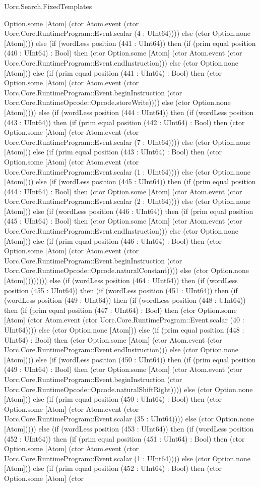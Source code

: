 \begin{lexlean}{Uorc.Search.FixedTemplates}
\begin{semanticmodule}
{Option.some [Atom] (ctor Atom.event (ctor Uorc.Core.RuntimeProgram::Event.scalar (4 : UInt64)))) else (ctor Option.none [Atom]))) else (if (wordLess position (441 : UInt64)) then (if (prim equal position (440 : UInt64) : Bool) then (ctor Option.some [Atom] (ctor Atom.event (ctor Uorc.Core.RuntimeProgram::Event.endInstruction))) else (ctor Option.none [Atom])) else (if (prim equal position (441 : UInt64) : Bool) then (ctor Option.some [Atom] (ctor Atom.event (ctor Uorc.Core.RuntimeProgram::Event.beginInstruction (ctor Uorc.Core.RuntimeOpcode::Opcode.storeWrite)))) else (ctor Option.none [Atom])))) else (if (wordLess position (444 : UInt64)) then (if (wordLess position (443 : UInt64)) then (if (prim equal position (442 : UInt64) : Bool) then (ctor Option.some [Atom] (ctor Atom.event (ctor Uorc.Core.RuntimeProgram::Event.scalar (7 : UInt64)))) else (ctor Option.none [Atom])) else (if (prim equal position (443 : UInt64) : Bool) then (ctor Option.some [Atom] (ctor Atom.event (ctor Uorc.Core.RuntimeProgram::Event.scalar (1 : UInt64)))) else (ctor Option.none [Atom]))) else (if (wordLess position (445 : UInt64)) then (if (prim equal position (444 : UInt64) : Bool) then (ctor Option.some [Atom] (ctor Atom.event (ctor Uorc.Core.RuntimeProgram::Event.scalar (2 : UInt64)))) else (ctor Option.none [Atom])) else (if (wordLess position (446 : UInt64)) then (if (prim equal position (445 : UInt64) : Bool) then (ctor Option.some [Atom] (ctor Atom.event (ctor Uorc.Core.RuntimeProgram::Event.endInstruction))) else (ctor Option.none [Atom])) else (if (prim equal position (446 : UInt64) : Bool) then (ctor Option.some [Atom] (ctor Atom.event (ctor Uorc.Core.RuntimeProgram::Event.beginInstruction (ctor Uorc.Core.RuntimeOpcode::Opcode.naturalConstant)))) else (ctor Option.none [Atom])))))))) else (if (wordLess position (464 : UInt64)) then (if (wordLess position (455 : UInt64)) then (if (wordLess position (451 : UInt64)) then (if (wordLess position (449 : UInt64)) then (if (wordLess position (448 : UInt64)) then (if (prim equal position (447 : UInt64) : Bool) then (ctor Option.some [Atom] (ctor Atom.event (ctor Uorc.Core.RuntimeProgram::Event.scalar (40 : UInt64)))) else (ctor Option.none [Atom])) else (if (prim equal position (448 : UInt64) : Bool) then (ctor Option.some [Atom] (ctor Atom.event (ctor Uorc.Core.RuntimeProgram::Event.endInstruction))) else (ctor Option.none [Atom]))) else (if (wordLess position (450 : UInt64)) then (if (prim equal position (449 : UInt64) : Bool) then (ctor Option.some [Atom] (ctor Atom.event (ctor Uorc.Core.RuntimeProgram::Event.beginInstruction (ctor Uorc.Core.RuntimeOpcode::Opcode.naturalShiftRight)))) else (ctor Option.none [Atom])) else (if (prim equal position (450 : UInt64) : Bool) then (ctor Option.some [Atom] (ctor Atom.event (ctor Uorc.Core.RuntimeProgram::Event.scalar (35 : UInt64)))) else (ctor Option.none [Atom])))) else (if (wordLess position (453 : UInt64)) then (if (wordLess position (452 : UInt64)) then (if (prim equal position (451 : UInt64) : Bool) then (ctor Option.some [Atom] (ctor Atom.event (ctor Uorc.Core.RuntimeProgram::Event.scalar (1 : UInt64)))) else (ctor Option.none [Atom])) else (if (prim equal position (452 : UInt64) : Bool) then (ctor Option.some [Atom] (ctor }
\end{semanticmodule}
\end{lexlean}
